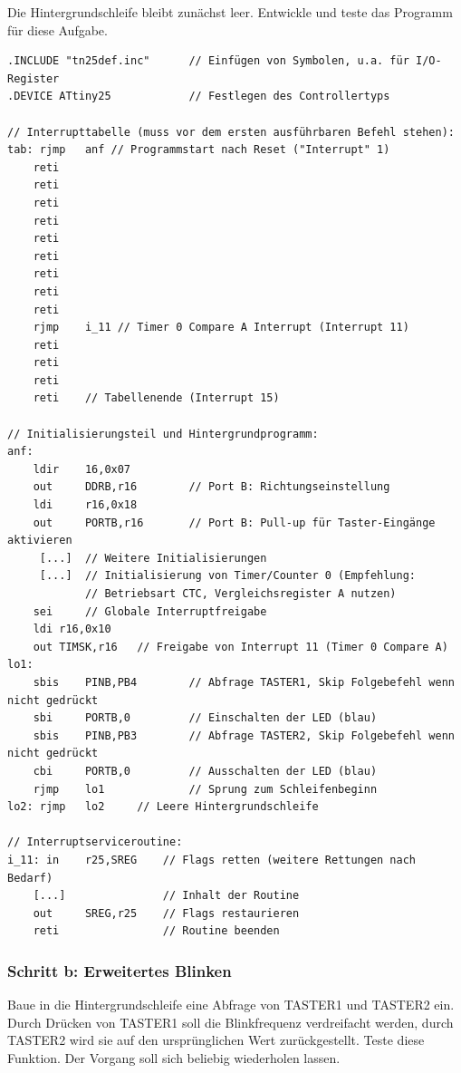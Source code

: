 \documentclass[a4paper,12pt,titlepage]{scrartcl}
\begin{document}
Die Hintergrundschleife bleibt zunächst leer. Entwickle und teste das Programm für diese Aufgabe.

\begin{lstlisting}[basicstyle=\tiny]
.INCLUDE "tn25def.inc"      // Einfügen von Symbolen, u.a. für I/O-Register
.DEVICE ATtiny25            // Festlegen des Controllertyps

// Interrupttabelle (muss vor dem ersten ausführbaren Befehl stehen):
tab: rjmp   anf // Programmstart nach Reset ("Interrupt" 1)
    reti
    reti
    reti
    reti
    reti
    reti
    reti
    reti
    reti
    rjmp    i_11 // Timer 0 Compare A Interrupt (Interrupt 11)
    reti
    reti
    reti
    reti    // Tabellenende (Interrupt 15)

// Initialisierungsteil und Hintergrundprogramm:
anf: 
    ldir    16,0x07
    out     DDRB,r16        // Port B: Richtungseinstellung
    ldi     r16,0x18
    out     PORTB,r16       // Port B: Pull-up für Taster-Eingänge aktivieren
     [...]  // Weitere Initialisierungen
     [...]  // Initialisierung von Timer/Counter 0 (Empfehlung:
            // Betriebsart CTC, Vergleichsregister A nutzen)
    sei     // Globale Interruptfreigabe
    ldi r16,0x10
    out TIMSK,r16   // Freigabe von Interrupt 11 (Timer 0 Compare A)
lo1:
    sbis    PINB,PB4        // Abfrage TASTER1, Skip Folgebefehl wenn nicht gedrückt
    sbi     PORTB,0         // Einschalten der LED (blau)
    sbis    PINB,PB3        // Abfrage TASTER2, Skip Folgebefehl wenn nicht gedrückt
    cbi     PORTB,0         // Ausschalten der LED (blau)
    rjmp    lo1             // Sprung zum Schleifenbeginn
lo2: rjmp   lo2     // Leere Hintergrundschleife

// Interruptserviceroutine:
i_11: in    r25,SREG    // Flags retten (weitere Rettungen nach Bedarf)
    [...]               // Inhalt der Routine
    out     SREG,r25    // Flags restaurieren
    reti                // Routine beenden
\end{lstlisting}

\subsubsection*{Schritt b: Erweitertes Blinken}
Baue in die Hintergrundschleife eine Abfrage von TASTER1 und TASTER2 ein. Durch Drücken von TASTER1 soll die Blinkfrequenz verdreifacht werden, durch TASTER2 wird sie auf den ursprünglichen Wert zurückgestellt. Teste diese Funktion. Der Vorgang soll sich beliebig wiederholen lassen.
\end{document}
